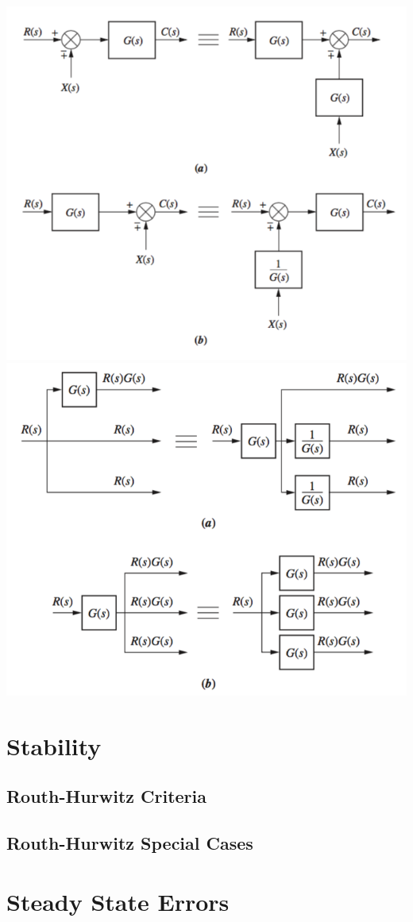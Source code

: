 \documentclass[11pt]{article}
\begin{document}
    \begin{center}
        \includegraphics[width=300 px]{img/move1}
        \includegraphics[width=300 px]{img/move2}
    \end{center}
    
    \pagebreak


    \section{Stability}
    \subsection{Routh-Hurwitz Criteria}
    \subsection{Routh-Hurwitz Special Cases}
    
    \pagebreak


    \section{Steady State Errors}
\end{document}
